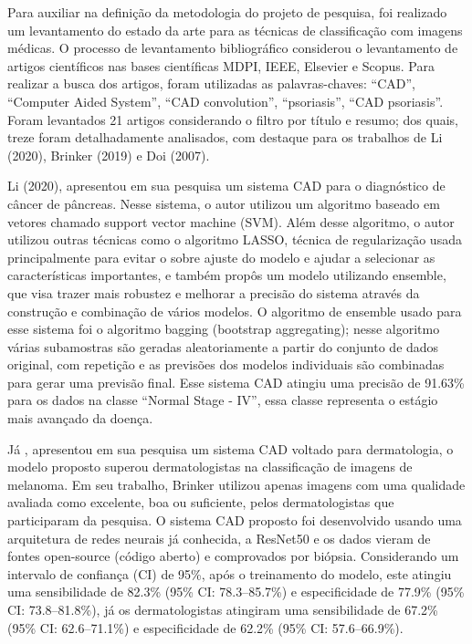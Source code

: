 Para auxiliar na definição da metodologia do projeto de pesquisa, foi realizado um levantamento do estado da arte para as técnicas de classificação com imagens médicas. O processo de levantamento bibliográfico considerou o levantamento de artigos científicos nas bases científicas MDPI, IEEE, Elsevier e Scopus. Para realizar a busca dos artigos, foram utilizadas as palavras-chaves: “CAD”, “Computer Aided System”, “CAD convolution”, “psoriasis”, “CAD psoriasis”. Foram levantados 21 artigos considerando o filtro por título e resumo; dos quais, treze foram detalhadamente analisados, com destaque para os trabalhos de Li (2020), Brinker (2019) e Doi (2007).



Li (2020), apresentou em sua pesquisa um sistema CAD para o diagnóstico de câncer de pâncreas. Nesse sistema, o autor utilizou um algoritmo baseado em vetores chamado support vector machine (SVM). Além desse algoritmo, o autor utilizou outras técnicas como o algoritmo LASSO, técnica de regularização usada principalmente para evitar o sobre ajuste do modelo e ajudar a selecionar as características importantes, e também propôs um modelo utilizando ensemble, que visa trazer mais robustez e melhorar a precisão do sistema através da construção e combinação de vários modelos. O algoritmo de ensemble usado para esse sistema foi o algoritmo bagging (bootstrap aggregating); nesse algoritmo várias subamostras são geradas aleatoriamente a partir do conjunto de dados original, com repetição e as previsões dos modelos individuais são combinadas para gerar uma previsão final. Esse sistema CAD atingiu uma precisão de 91.63\% para os dados na classe “Normal Stage - IV”, essa classe representa o estágio mais avançado da doença.


Já \cite{BRINKER201911}, apresentou em sua pesquisa um sistema CAD voltado para dermatologia, o modelo proposto superou dermatologistas na classificação de imagens de melanoma. Em seu trabalho, Brinker utilizou apenas imagens com uma qualidade avaliada como excelente, boa ou suficiente, pelos dermatologistas que participaram da pesquisa. O sistema CAD proposto foi desenvolvido usando uma arquitetura de redes neurais já conhecida, a ResNet50 e os dados vieram de fontes open-source (código aberto) e comprovados por biópsia. Considerando um intervalo de confiança (CI) de 95\%, após o treinamento do modelo, este atingiu uma sensibilidade de 82.3\% (95\% CI: 78.3–85.7\%) e especificidade de 77.9\% (95\% CI: 73.8–81.8\%), já os dermatologistas atingiram uma sensibilidade de 67.2\% (95\% CI: 62.6–71.1\%) e especificidade de 62.2\% (95\% CI: 57.6–66.9\%).


